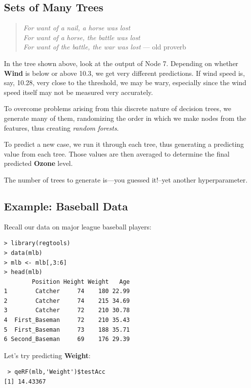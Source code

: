 \subsection{Sets of Many Trees}

\noindent
\begin{quote}
{\it
For want of a nail, a horse was lost \\
For want of a horse, the battle was lost \\
For want of the battle, the war was lost
} --- old proverb
\end{quote}

In the tree shown above, look at the output of Node 7.  Depending on
whether \textbf{Wind} is below or above 10.3, we get very different
predictions.  If wind speed is, say, 10.28, very close to the threshold,
we may be wary, especially since the wind speed itself may not be
measured very accurately.

To overcome problems arising from this discrete nature of decision
trees, we generate many of them, randomizing the order in which we make
nodes from the features, thus creating \textit{random forests}.

To predict a new case, we run it through each tree, thus generating a
predicting value from each tree.  Those values are then averaged to
determine the final predicted \textbf{Ozone} level.

The number of trees to generate is---you guessed it!--yet another
hyperparameter.

\subsection{Example:  Baseball Data}

Recall our data on major league baseball players:

\begin{lstlisting}
> library(regtools)
> data(mlb)
> mlb <- mlb[,3:6]
> head(mlb)
        Position Height Weight   Age
1        Catcher     74    180 22.99
2        Catcher     74    215 34.69
3        Catcher     72    210 30.78
4  First_Baseman     72    210 35.43
5  First_Baseman     73    188 35.71
6 Second_Baseman     69    176 29.39
\end{lstlisting}

Let's try predicting \textbf{Weight}:

\begin{lstlisting} > qeRF(mlb,'Weight')$testAcc
[1] 14.43367
\end{lstlisting}

